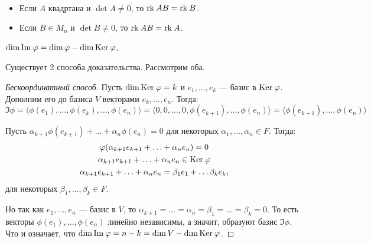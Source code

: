 \begin{Task}\
    \begin{itemize}
        \item Если $A$ квадртана и $\det A \neq 0$, то $\mathrm{rk}\: AB = \mathrm{rk}\: B$.
        \item Если $B \in M_n$ и $\det B \neq 0$, то $\mathrm{rk}\: AB = \mathrm{rk}\: A$.
    \end{itemize}
\end{Task}

\begin{Theorem}
    $\dim \mathrm{Im\:} \varphi = \dim \varphi - \dim \mathrm{Ker}\: \varphi$.
\end{Theorem}

Существует 2 способа доказательства. Рассмотрим оба.

\begin{proof}[Бескоординатный способ]
     Пусть $\dim \mathrm{Ker}\: \varphi = k$ и $e_1, \ldots, e_k$ --- базис в $\mathrm{Ker}\: \varphi$. Дополним его до базиса $V$ векторами $e_k, \ldots, e_n$. Тогда:
    \[
        \Im \phi = \langle\phi(e_1), \ldots, \phi(e_k), \ldots, \phi(e_n)\rangle = \langle0, 0, \ldots, 0, \phi(e_{k+1}), \ldots, \phi(e_n)\rangle = \langle\phi(e_{k+1}), \ldots, \phi(e_{n})\rangle
    \]
    
Пусть $\alpha_{k+1}\phi(e_{k+1}) + \ldots + \alpha_n\phi(e_n) = 0$ для некоторых $\alpha_1, \ldots, \alpha_n \in F$. Тогда:
\begin{gather*}
    \varphi(\alpha_{k+1}e_{k+1} + \ldots + \alpha_ne_n) = 0 \\
    \alpha_{k+1}e_{k+1} + \ldots + \alpha_ne_n \in \mathrm{Ker}\: \varphi \\
    \alpha_{k+1}e_{k+1} + \ldots + \alpha_ne_n = \beta_1e_1 + \ldots \beta_ke_k,
\end{gather*}
для некоторых $\beta_1, \ldots, \beta_k \in F$.

Но так как $e_1, \ldots, e_n$ --- базис в $V$, то $\alpha_{k+1} =  \ldots = \alpha_n = \beta_1 = \ldots = \beta_k = 0$. То есть векторы $\phi(e_1), \ldots, \phi(e_n)$ линейно независимы, а значит, образуют базис $\Im \phi$. Что и означает, что $\dim\mathrm{Im\:}\varphi = n - k = \dim V - \dim\mathrm{Ker}\:\varphi$.
\end{proof}

